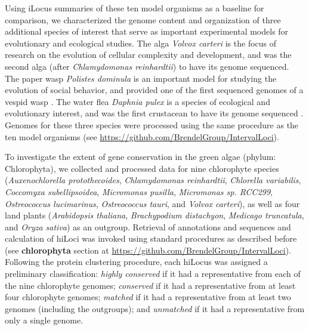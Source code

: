 Using iLocus summaries of these ten model organisms as a baseline for comparison, we characterized the genome content and organization of three additional species of interest that serve as important experimental models for evolutionary and ecological studies.
The alga \textit{Volvox carteri} is the focus of research on the evolution of cellular complexity and development, and was the second alga (after \textit{Chlamydomonas reinhardtii}) to have its genome sequenced.
The paper wasp \textit{Polistes dominula} is an important model for studying the evolution of social behavior, and provided one of the first sequenced genomes of a vespid wasp \cite{PdomGenome}.
The water flea \textit{Daphnia pulex} is a species of ecological and evolutionary interest, and was the first crustacean to have its genome sequenced \cite{DaphniaGenome}.
Genomes for these three species were processed using the same procedure as the ten model organisms (see \url{https://github.com/BrendelGroup/IntervalLoci}).


To investigate the extent of gene conservation in the green algae (phylum: Chlorophyta), we collected and processed data for nine chlorophyte species (\textit{Auxenochlorella protothecoides}, \textit{Chlamydomonas reinhardtii}, \textit{Chlorella variabilis}, \textit{Coccomyxa subellipsoidea}, \textit{Micromonas pusilla}, \textit{Micromonas sp. RCC299}, \textit{Ostreococcus lucimarinus}, \textit{Ostreococcus tauri}, and \textit{Volvox carteri}), as well as four land plants (\textit{Arabidopsis thaliana}, \textit{Brachypodium distachyon}, \textit{Medicago truncatula}, and \textit{Oryza sativa}) as an outgroup.
Retrieval of annotations and sequences and calculation of hiLoci was invoked using standard procedures as described before (see \mbox{\textbf{chlorophyta}} section at \url{https://github.com/BrendelGroup/IntervalLoci}).
Following the protein clustering procedure, each hiLocus was assigned a preliminary classification: \textit{highly conserved} if it had a representative from each of the nine chlorophyte genomes; \textit{conserved} if it had a representative from at least four chlorophyte genomes; \textit{matched} if it had a representative from at least two genomes (including the outgroups); and \textit{unmatched} if it had a representative from only a single genome.

